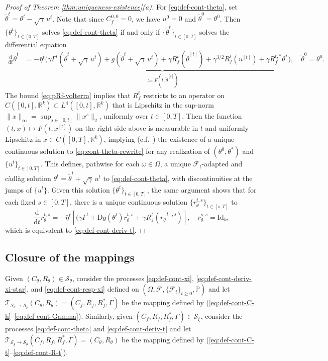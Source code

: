 \documentclass[11pt,letterpaper,reqno]{amsart}
\theoremstyle{definition}
\def\d{\mathrm{d}}
\def\D{\mathrm{D}}
\def\P{\mathbb{P}}
\def\R{\mathbb{R}}
\def\Id{\mathrm{Id}}
\def\cS{\mathcal{S}}
\def\cF{\mathcal{F}}
\def\Ct{C_\theta}
\def\Rt{R_\theta}
\def\Cf{C_f}
\def\Rf{R_f}
\def\trsfrmA{\mathcal{T}_{\mathcal{S}_\xi \to {\mathcal{S}}_\theta}}
\def\trsfrmB{\mathcal{T}_{{\mathcal{S}}_\theta \to \mathcal{S}_\xi}}
\begin{document}
\begin{proof}[Proof of Theorem \ref{thm:uniqueness-existence}(a)]
For \eqref{eq:def-cont-theta}, set $\tilde
\theta^t=\theta^t-\sqrt{\gamma}\,u^t$. Note that since $C_f^{0,0}=0$, we have
$u^0=0$ and $\tilde \theta^0=\theta^0$. Then
$\{\theta^t\}_{t \in [0,T]}$ solves
\eqref{eq:def-cont-theta} if and only if 
$\{\tilde \theta^t\}_{t \in [0,T]}$ solves the differential equation
\begin{align}
\frac{\d}{\d t}\tilde\theta^t&=\underbrace{-\bar\eta^t \Big({\gamma}\Gamma^t
(\tilde\theta^t + \sqrt{\gamma}\,u^t)+g(\tilde\theta^t + \sqrt{\gamma}\,
u^t)+{\gamma}R_f^t(\tilde\theta^{[t]})+ {\gamma^{3/2}}
R_f^t(u^{[t]})+{\gamma}R_f^{t,*}\theta^*\Big)}_{:=F(t,\tilde\theta^{[t]})},
\quad \tilde\theta^0=\theta^0.\label{eq:cont-theta-rewrite}
\end{align}
The bound \eqref{eq:pRf-volterra} implies that
$R_f^t$ restricts to an operator on $C([0,t],\R^k) \subset L^4([0,t],\R^k)$ that
is Lipschitz in the sup-norm $\|x\|_\infty=\sup_{s \in [0,t]} \|x^s\|_2$,
uniformly over $t \in [0,T]$. Then the function $(t,x) \mapsto F(t,x^{[t]})$
on the right side above is measurable
in $t$ and uniformly Lipschitz in $x \in C([0,T],\R^k)$, implying
(c.f.\ \cite[Theorems 2.1, 2.3]{hale2013introduction})
the existence of a unique continuous solution to \eqref{eq:cont-theta-rewrite} 
for any realization of $(\theta^0,\theta^*)$ and
$\{u^t\}_{t \in [0,T]}$. This defines, pathwise for each $\omega \in \Omega$,
a unique $\cF_t$-adapted and c\`adl\`ag solution
$\theta^t=\tilde \theta^t+\sqrt{\gamma}\,u^t$ to \eqref{eq:def-cont-theta}, with discontinuities at the jumps of $\{u^t\}$.
Given this solution $\{\theta^t\}_{t \in [0,T]}$, the same argument shows that
for each fixed $s \in [0,T]$, there is a unique continuous solution
$\{r_\theta^{t,s}\}_{t \in [s,T]}$ to
\[\frac{\d}{\d t}r_\theta^{t,s}
={-}\bar\eta^t[(\gamma \Gamma^t+\D g(\theta^t)r_\theta^{t,s}
+\gamma R_f^t(r_\theta^{[t],s})],
\quad r_\theta^{s,s}=\Id_k,\]
which is equivalent to \eqref{eq:def-cont-deriv-t}.
\end{proof}

\subsection{Closure of the mappings}

Given $(\Ct,\Rt) \in \cS_\theta$, consider the processes \eqref{eq:def-cont-xi},
\eqref{eq:def-cont-deriv-xi-star}, and \eqref{eq:def-cont-resp-xi}
defined on $(\Omega,\cF,\{\cF_t\}_{t \geq 0},\P)$ and let
$\trsfrmB(\Ct,\Rt)=(\Cf,\Rf,\Rf^*,\Gamma)$ be the mapping defined by
(\ref{eq:def-cont-C-h}--\ref{eq:def-cont-Gamma}). Similarly, given
$(\Cf,\Rf,\Rf^*,\Gamma) \in \cS_\xi$, consider the processes
\eqref{eq:def-cont-theta} and \eqref{eq:def-cont-deriv-t} and let
$\trsfrmA(\Cf,\Rf,\Rf^*,\Gamma)=(\Ct,\Rt)$ be the mapping defined by
(\ref{eq:def-cont-C-t}--\ref{eq:def-cont-R-t}).
\end{document}
